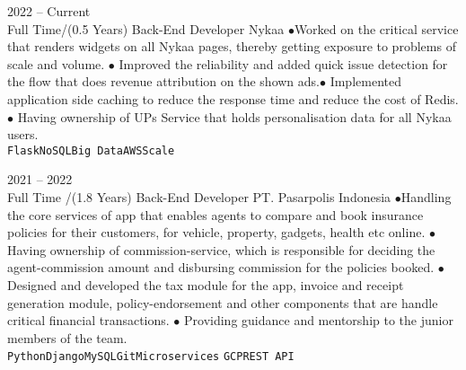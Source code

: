 \documentclass[9pt]{developercv} %
\begin{document}
\begin{entrylist}

		\entry
	{2022 -- Current\\\footnotesize{Full Time/(0.5 Years)}}
	{Back-End Developer}
	{Nykaa}
	{$\bullet$Worked on the critical service that renders widgets on all Nykaa pages, thereby getting exposure to problems of scale and volume. $\bullet$ Improved the reliability and added quick issue detection for the flow that does revenue attribution on the shown ads.$\bullet$ Implemented application side caching to reduce the response time and reduce the cost of Redis.$\bullet$ Having ownership of UPs Service that holds personalisation data for all Nykaa users.\\ \texttt{Flask}\slashsep\texttt{NoSQL}\slashsep\texttt{Big Data}\slashsep\texttt{AWS}\slashsep\texttt{Scale}}

		\entry
	{2021 -- 2022\\\footnotesize{Full Time /(1.8 Years)}}
	{Back-End Developer}
	{PT. Pasarpolis Indonesia}
	{$\bullet$Handling the core services of app that enables agents to compare and book insurance policies for their customers, for vehicle, property, gadgets, health  etc online. $\bullet$ Having ownership of commission-service, which is responsible for deciding the agent-commission amount and disbursing commission for the policies booked. $\bullet$ Designed and developed the tax module for the app, invoice and receipt generation module, policy-endorsement and other components that are handle critical financial transactions. $\bullet$ Providing guidance and mentorship to the junior members of the team.\\ \texttt{Python}\slashsep\texttt{Django}\slashsep\texttt{MySQL}\slashsep\texttt{Git}\slashsep\texttt{Microservices} \slashsep\texttt{GCP}\slashsep\texttt{REST API}}
	

\end{entrylist}
\end{document}
